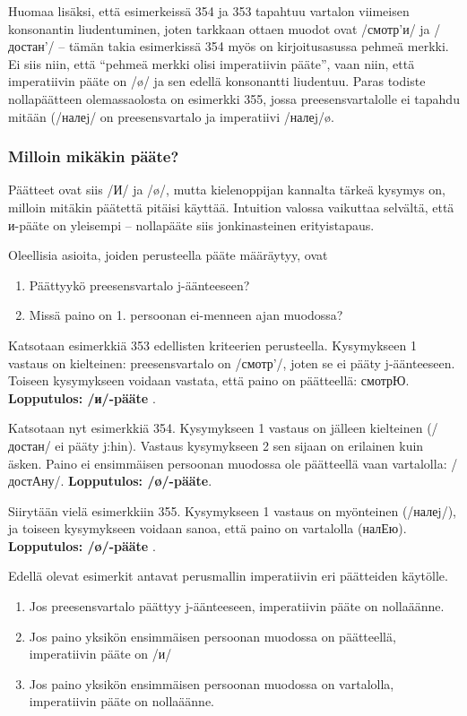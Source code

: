 \documentclass[]{scrartcl}
\providecommand{\tightlist}{%
  \setlength{\itemsep}{0pt}\setlength{\parskip}{0pt}}
\begin{document}
Huomaa lisäksi, että esimerkeissä 354 ja 353 tapahtuu vartalon viimeisen
konsonantin liudentuminen, joten tarkkaan ottaen muodot ovat /смотр'и/
ja /достан'/ -- tämän takia esimerkissä 354 myös on kirjoitusasussa
pehmeä merkki. Ei siis niin, että ``pehmeä merkki olisi imperatiivin
pääte'', vaan niin, että imperatiivin pääte on /ø/ ja sen edellä
konsonantti liudentuu. Paras todiste nollapäätteen olemassaolosta on
esimerkki 355, jossa preesensvartalolle ei tapahdu mitään (/налеj/ on
preesensvartalo ja imperatiivi /налеj/ø.

\subsubsection{Milloin mikäkin
pääte?}\label{milloin-mikuxe4kin-puxe4uxe4te}

Päätteet ovat siis /И/ ja /ø/, mutta kielenoppijan kannalta tärkeä
kysymys on, milloin mitäkin päätettä pitäisi käyttää. Intuition valossa
vaikuttaa selvältä, että и-pääte on yleisempi -- nollapääte siis
jonkinasteinen erityistapaus.

Oleellisia asioita, joiden perusteella pääte määräytyy, ovat

\begin{enumerate}
\def\labelenumi{\arabic{enumi}.}
\tightlist
\item
  Päättyykö preesensvartalo j-äänteeseen?
\item
  Missä paino on 1. persoonan ei-menneen ajan muodossa?
\end{enumerate}

Katsotaan esimerkkiä 353 edellisten kriteerien perusteella. Kysymykseen
1 vastaus on kielteinen: preesensvartalo on /смотр'/, joten se ei pääty
j-äänteeseen. Toiseen kysymykseen voidaan vastata, että paino on
päätteellä: смотрЮ. \textbf{Lopputulos: /и/-pääte} .

Katsotaan nyt esimerkkiä 354. Kysymykseen 1 vastaus on jälleen
kielteinen (/достан/ ei pääty j:hin). Vastaus kysymykseen 2 sen sijaan
on erilainen kuin äsken. Paino ei ensimmäisen persoonan muodossa ole
päätteellä vaan vartalolla: /достАну/. \textbf{Lopputulos: /ø/-pääte}.

Siirytään vielä esimerkkiin 355. Kysymykseen 1 vastaus on myönteinen
(/налеj/), ja toiseen kysymykseen voidaan sanoa, että paino on
vartalolla (налЕю). \textbf{Lopputulos: /ø/-pääte} .

Edellä olevat esimerkit antavat perusmallin imperatiivin eri päätteiden
käytölle.

\begin{enumerate}
\def\labelenumi{\arabic{enumi}.}
\tightlist
\item
  Jos preesensvartalo päättyy j-äänteeseen, imperatiivin pääte on
  nollaäänne.
\item
  Jos paino yksikön ensimmäisen persoonan muodossa on päätteellä,
  imperatiivin pääte on /и/
\item
  Jos paino yksikön ensimmäisen persoonan muodossa on vartalolla,
  imperatiivin pääte on nollaäänne.
\end{enumerate}
\end{document}
